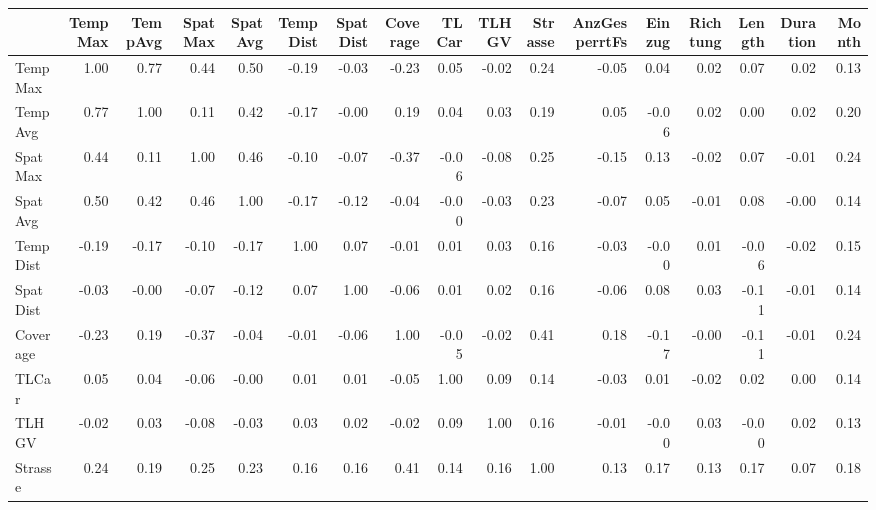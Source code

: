 \begin{tabular}{lrrrrrrrrrrrrrrrr}
\toprule
{} &  TempMax &  TempAvg &  SpatMax &  SpatAvg &  TempDist &  SpatDist &  Coverage &  TLCar &  TLHGV &  Strasse &  AnzGesperrtFs &  Einzug &  Richtung &  Length &  Duration &  Month \\
\midrule
TempMax       &     1.00 &     0.77 &     0.44 &     0.50 &     -0.19 &     -0.03 &     -0.23 &   0.05 &  -0.02 &     0.24 &          -0.05 &    0.04 &      0.02 &    0.07 &      0.02 &   0.13 \\
TempAvg       &     0.77 &     1.00 &     0.11 &     0.42 &     -0.17 &     -0.00 &      0.19 &   0.04 &   0.03 &     0.19 &           0.05 &   -0.06 &      0.02 &    0.00 &      0.02 &   0.20 \\
SpatMax       &     0.44 &     0.11 &     1.00 &     0.46 &     -0.10 &     -0.07 &     -0.37 &  -0.06 &  -0.08 &     0.25 &          -0.15 &    0.13 &     -0.02 &    0.07 &     -0.01 &   0.24 \\
SpatAvg       &     0.50 &     0.42 &     0.46 &     1.00 &     -0.17 &     -0.12 &     -0.04 &  -0.00 &  -0.03 &     0.23 &          -0.07 &    0.05 &     -0.01 &    0.08 &     -0.00 &   0.14 \\
TempDist      &    -0.19 &    -0.17 &    -0.10 &    -0.17 &      1.00 &      0.07 &     -0.01 &   0.01 &   0.03 &     0.16 &          -0.03 &   -0.00 &      0.01 &   -0.06 &     -0.02 &   0.15 \\
SpatDist      &    -0.03 &    -0.00 &    -0.07 &    -0.12 &      0.07 &      1.00 &     -0.06 &   0.01 &   0.02 &     0.16 &          -0.06 &    0.08 &      0.03 &   -0.11 &     -0.01 &   0.14 \\
Coverage      &    -0.23 &     0.19 &    -0.37 &    -0.04 &     -0.01 &     -0.06 &      1.00 &  -0.05 &  -0.02 &     0.41 &           0.18 &   -0.17 &     -0.00 &   -0.11 &     -0.01 &   0.24 \\
TLCar         &     0.05 &     0.04 &    -0.06 &    -0.00 &      0.01 &      0.01 &     -0.05 &   1.00 &   0.09 &     0.14 &          -0.03 &    0.01 &     -0.02 &    0.02 &      0.00 &   0.14 \\
TLHGV         &    -0.02 &     0.03 &    -0.08 &    -0.03 &      0.03 &      0.02 &     -0.02 &   0.09 &   1.00 &     0.16 &          -0.01 &   -0.00 &      0.03 &   -0.00 &      0.02 &   0.13 \\
Strasse       &     0.24 &     0.19 &     0.25 &     0.23 &      0.16 &      0.16 &      0.41 &   0.14 &   0.16 &     1.00 &           0.13 &    0.17 &      0.13 &    0.17 &      0.07 &   0.18 \\

\end{tabular}

